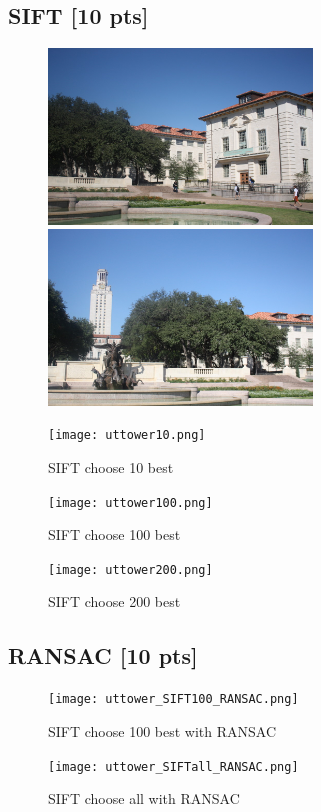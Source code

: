 \documentclass[a4paper,UTF8]{article}
\numberwithin{equation}{section}
\begin{document}
\subsection{SIFT [10 pts]}
\begin{figure}[!h]
\centering
\begin{minipage}[t]{0.48\textwidth}
\centering
\includegraphics[width=7cm]{uttower1.jpg}
\end{minipage}
\begin{minipage}[t]{0.48\textwidth}
\centering
\includegraphics[width=7cm]{uttower2.jpg}
\end{minipage}
\end{figure}

\begin{figure}[h]
	\centering  %
	\texttt{[image: uttower10.png]}  %
	\caption{SIFT choose 10 best}
\end{figure}

\begin{figure}[h]
	\centering  %
	\texttt{[image: uttower100.png]}  %
	\caption{SIFT choose 100 best}
\end{figure}

\begin{figure}[h]
	\centering  %
	\texttt{[image: uttower200.png]}  %
	\caption{SIFT choose 200 best}
\end{figure}

\newpage

\newpage
\subsection{RANSAC [10 pts]}
\begin{figure}[h]
	\centering  %
	\texttt{[image: uttower\_SIFT100\_RANSAC.png]}  %
	\caption{SIFT choose 100 best with RANSAC}
\end{figure}
\begin{figure}[h]
	\centering  %
	\texttt{[image: uttower\_SIFTall\_RANSAC.png]}  %
	\caption{SIFT choose all with RANSAC}
\end{figure}
\end{document}
